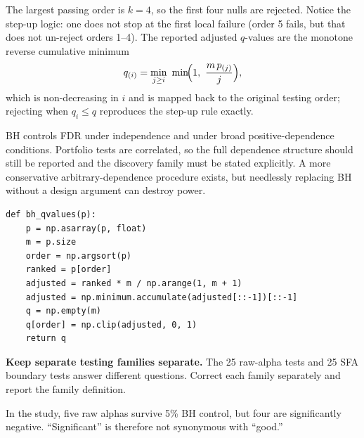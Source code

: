 The largest passing order is $k=4$, so the first four nulls are rejected.
Notice the step-up logic: one does not stop at the first local failure
(order 5 fails, but that does not un-reject orders 1--4). The reported
adjusted $q$-values are the monotone reverse cumulative minimum
\begin{equation}\label{eq:ch7-qval}
q_{(i)} = \min_{j\ge i}\ \min\!\Bigl(1,\ \frac{m\,p_{(j)}}{j}\Bigr),
\end{equation}
which is non-decreasing in $i$ and is mapped back to the original testing
order; rejecting when $q_i\le q$ reproduces the step-up rule exactly.

BH controls FDR under independence and under broad positive-dependence
conditions. Portfolio tests are correlated, so the full dependence
structure should still be reported and the discovery family must be
stated explicitly. A more conservative arbitrary-dependence procedure
exists, but needlessly replacing BH without a design argument can
destroy power.

\begin{verbatim}
def bh_qvalues(p):
    p = np.asarray(p, float)
    m = p.size
    order = np.argsort(p)
    ranked = p[order]
    adjusted = ranked * m / np.arange(1, m + 1)
    adjusted = np.minimum.accumulate(adjusted[::-1])[::-1]
    q = np.empty(m)
    q[order] = np.clip(adjusted, 0, 1)
    return q
\end{verbatim}

\textbf{Keep separate testing families separate.} The 25 raw-alpha tests
and 25 SFA boundary tests answer different questions. Correct each
family separately and report the family definition.

In the study, five raw alphas survive 5\% BH control, but four are
significantly negative. ``Significant'' is therefore not synonymous with
``good.''

